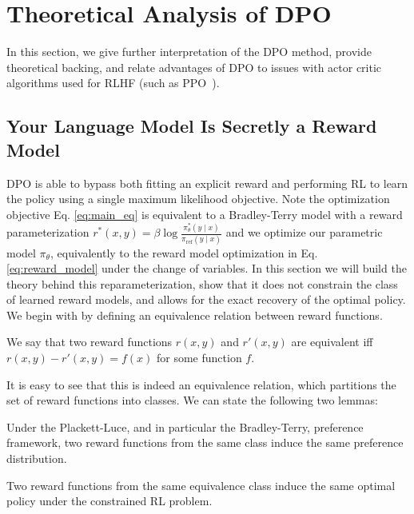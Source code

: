 \section{Theoretical Analysis of DPO} In this section, we give further interpretation of the DPO method, provide theoretical backing, and relate advantages of DPO to issues with actor critic algorithms used for RLHF (such as PPO~\cite{schulman2017proximal}).

\label{sec:theory}

\subsection{Your Language Model Is Secretly a Reward Model} DPO is able to bypass both fitting an explicit reward and performing RL to learn the policy using a single maximum likelihood objective. Note the optimization objective Eq. \ref{eq:main_eq} is equivalent to a Bradley-Terry model with a reward parameterization $r^*(x, y) = \beta \log\frac{\pi^*_\theta(y \mid x)}{\pi_\text{ref}(y \mid x)}$ and we optimize our parametric model $\pi_{\theta}$, equivalently to the reward model optimization in Eq. \ref{eq:reward_model} under the change of variables. In this section we will build the theory behind this reparameterization, show that it does not constrain the class of learned reward models, and allows for the exact recovery of the optimal policy. We begin with by defining an equivalence relation between reward functions.

\begin{definition}
We say that two reward functions $r(x, y)$ and $r'(x, y)$ are equivalent iff ${r(x, y)-r'(x, y) = f(x)}$ for some function $f$.     
\end{definition}

It is easy to see that this is indeed an equivalence relation, which partitions the set of reward functions into classes. We can state the following two lemmas:

\begin{lemma}\label{lemma:same_prefrence} Under the Plackett-Luce, and in particular the Bradley-Terry, preference framework, two reward functions from the same class induce the same preference distribution.
\end{lemma}

\begin{lemma}\label{lemma:same_policy}
    Two reward functions from the same equivalence class induce the same optimal policy under the constrained RL problem.
\end{lemma}

